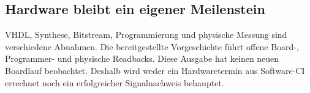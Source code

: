\begin{cols}
\subsection*{Hardware bleibt ein eigener Meilenstein}
VHDL, Synthese, Bitstream, Programmierung und physische Messung sind verschiedene Abnahmen. Die bereitgestellte Vorgeschichte führt offene Board-, Programmer- und physische Readbacks. Diese Ausgabe hat keinen neuen Boardlauf beobachtet. Deshalb wird weder ein Hardwaretermin aus Software-CI errechnet noch ein erfolgreicher Signalnachweis behauptet. 
\end{cols}

